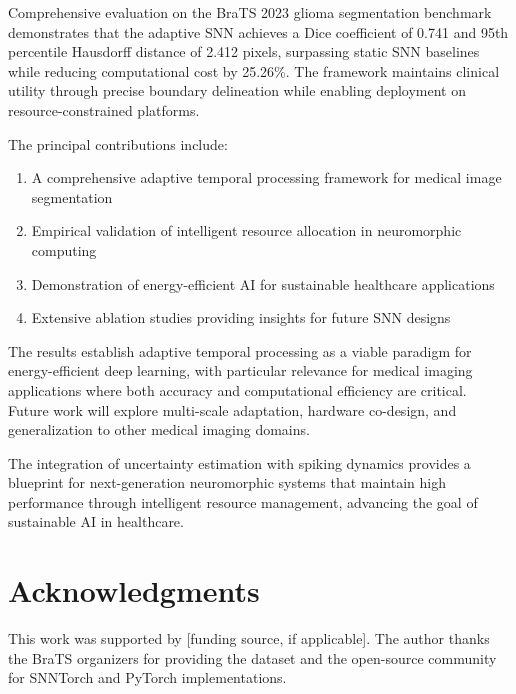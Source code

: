 \documentclass[12pt,a4paper]{article}
\begin{document}
Comprehensive evaluation on the BraTS 2023 glioma segmentation benchmark demonstrates that the adaptive SNN achieves a Dice coefficient of 0.741 and 95th percentile Hausdorff distance of 2.412 pixels, surpassing static SNN baselines while reducing computational cost by 25.26\%. The framework maintains clinical utility through precise boundary delineation while enabling deployment on resource-constrained platforms.

The principal contributions include:
\begin{enumerate}[label=\roman*.]
\item A comprehensive adaptive temporal processing framework for medical image segmentation
\item Empirical validation of intelligent resource allocation in neuromorphic computing
\item Demonstration of energy-efficient AI for sustainable healthcare applications
\item Extensive ablation studies providing insights for future SNN designs
\end{enumerate}

The results establish adaptive temporal processing as a viable paradigm for energy-efficient deep learning, with particular relevance for medical imaging applications where both accuracy and computational efficiency are critical. Future work will explore multi-scale adaptation, hardware co-design, and generalization to other medical imaging domains.

The integration of uncertainty estimation with spiking dynamics provides a blueprint for next-generation neuromorphic systems that maintain high performance through intelligent resource management, advancing the goal of sustainable AI in healthcare.

\section*{Acknowledgments}

This work was supported by [funding source, if applicable]. The author thanks the BraTS organizers for providing the dataset and the open-source community for SNNTorch and PyTorch implementations.



\end{document}
